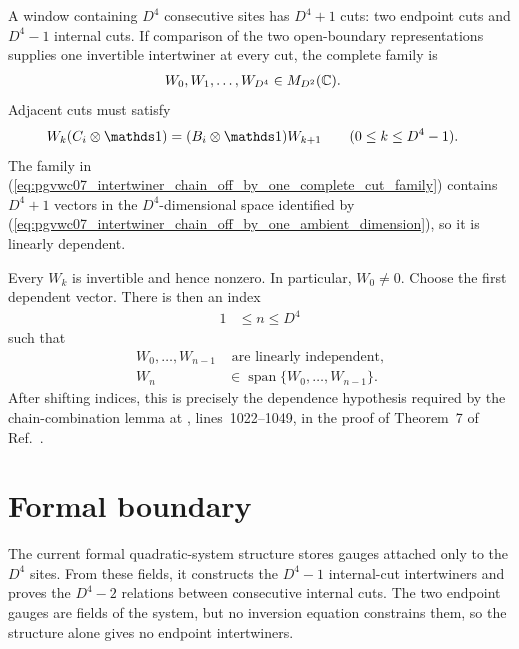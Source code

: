 \documentclass{article}
\begin{document}
A window containing $D^4$ consecutive sites has $D^4+1$ cuts: two endpoint
cuts and $D^4-1$ internal cuts. If comparison of the two open-boundary
representations supplies one invertible intertwiner at every cut, the complete
family is
\begin{align}
    W_0,W_1,\ldots,W_{D^4}
     & \in M_{D^2}(\mathbb{C}).
    \label{eq:pgvwc07_intertwiner_chain_off_by_one_complete_cut_family}
\end{align}
Adjacent cuts must satisfy
\begin{align}
    W_k(C_i\otimes\Id)
     & = (B_i\otimes\Id)W_{k+1}
    \qquad(0\leq k\leq D^4-1).
    \label{eq:pgvwc07_intertwiner_chain_off_by_one_complete_chain_relations}
\end{align}
The family in
(\ref{eq:pgvwc07_intertwiner_chain_off_by_one_complete_cut_family}) contains
$D^4+1$ vectors in the $D^4$-dimensional space identified by
(\ref{eq:pgvwc07_intertwiner_chain_off_by_one_ambient_dimension}), so it is
linearly dependent.

Every $W_k$ is invertible and hence nonzero. In particular, $W_0\neq0$.
Choose the first dependent vector. There is then an index
\begin{align}
    1
     & \leq n\leq D^4
    \label{eq:pgvwc07_intertwiner_chain_off_by_one_first_dependence_index}
\end{align}
such that
\begin{align}
    W_0,\ldots,W_{n-1}
     & \text{ are linearly independent},
    \label{eq:pgvwc07_intertwiner_chain_off_by_one_independent_prefix} \\
    W_n
     & \in\operatorname{span}\{W_0,\ldots,W_{n-1}\}.
    \label{eq:pgvwc07_intertwiner_chain_off_by_one_first_dependent_vector}
\end{align}
After shifting indices, this is precisely the dependence hypothesis required
by the chain-combination lemma at
, lines~1022--1049, in the proof
of Theorem~7 of Ref.~\cite{PerezGarcia2007Matrix}.

\section{Formal boundary}

The current formal quadratic-system structure stores gauges attached only to
the $D^4$ sites. From these fields, it constructs the $D^4-1$ internal-cut
intertwiners and proves the $D^4-2$ relations between consecutive internal
cuts. The two endpoint gauges are fields of the system, but no inversion
equation constrains them, so the structure alone gives no endpoint
intertwiners.
\end{document}
